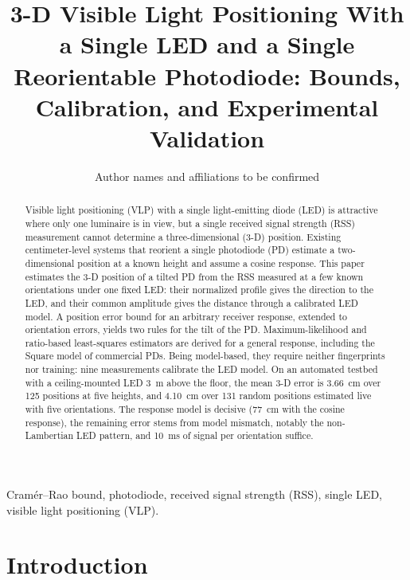 \documentclass[journal]{IEEEtran}
\begin{document}
\title{3-D Visible Light Positioning With a Single LED and a Single Reorientable Photodiode: Bounds, Calibration, and Experimental Validation}
\author{Author names and affiliations to be confirmed}
\maketitle
\begin{abstract}
Visible light positioning (VLP) with a single light-emitting diode (LED) is attractive where only one luminaire is in view, but a single received signal strength (RSS) measurement cannot determine a three-dimensional (\mbox{3-D}) position. Existing centimeter-level systems that reorient a single photodiode (PD) estimate a two-dimensional position at a known height and assume a cosine response. This paper estimates the \mbox{3-D} position of a tilted PD from the RSS measured at a few known orientations under one fixed LED: their normalized profile gives the direction to the LED, and their common amplitude gives the distance through a calibrated LED model. A position error bound for an arbitrary receiver response, extended to orientation errors, yields two rules for the tilt of the PD. Maximum-likelihood and ratio-based least-squares estimators are derived for a general response, including the Square model of commercial PDs. Being model-based, they require neither fingerprints nor training: nine measurements calibrate the LED model. On an automated testbed with a ceiling-mounted LED 3~m above the floor, the mean \mbox{3-D} error is 3.66~cm over 125 positions at five heights, and 4.10~cm over 131 random positions estimated live with five orientations. The response model is decisive (77~cm with the cosine response), the remaining error stems from model mismatch, notably the non-Lambertian LED pattern, and 10~ms of signal per orientation suffice.
\end{abstract}
\begin{IEEEkeywords}
Cram\'er--Rao bound, photodiode, received signal strength (RSS), single LED, visible light positioning (VLP).
\end{IEEEkeywords}

\section{Introduction}
\label{sec:introduction}

\end{document}
